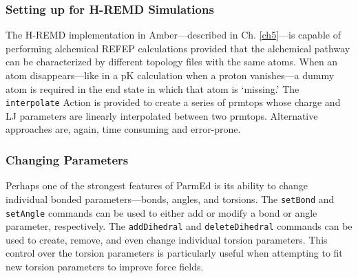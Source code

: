\subsubsection{Setting up for H-REMD Simulations}

The H-REMD implementation in Amber---described in Ch. \ref{ch5}---is capable of
performing alchemical REFEP calculations provided that the alchemical pathway
can be characterized by different topology files with the same atoms. When an
atom disappears---like in a pK calculation when a proton vanishes---a
dummy atom is required in the end state in which that atom is `missing.' The
{\tt interpolate} Action is provided to create a series of prmtops whose charge
and LJ parameters are linearly interpolated between two prmtops. Alternative
approaches are, again, time consuming and error-prone.

\subsubsection{Changing Parameters}

Perhaps one of the strongest features of ParmEd is its ability to change
individual bonded parameters---\ie bonds, angles, and torsions. The
{\tt setBond} and {\tt setAngle} commands can be used to either add or modify a
bond or angle parameter, respectively. The {\tt addDihedral} and
{\tt deleteDihedral} commands can be used to create, remove, and even change
individual torsion parameters. This control over the torsion parameters is
particularly useful when attempting to fit new torsion parameters to improve
force fields. \cite{Hornak_Proteins_2006_v65_p712,
Perez_BiophysJ_2007_v92_p3817, Lindorff-Larsen_Proteins_2010_v78_p1950}
